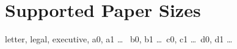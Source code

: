 \documentclass{article}
\begin{document}
\section*{Supported Paper Sizes}
  letter, legal, executive, a0, a1 \dots\ %
  b0, b1 \dots\ c0, c1 \dots\ d0, d1 \dots
  \blindtext
\end{document}
